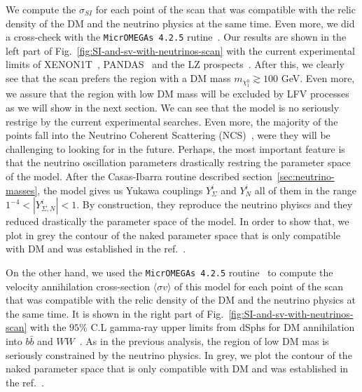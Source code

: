 \documentclass[12pt,letterpaper]{article}
\begin{document}
We compute the $\sigma_{SI}$ for each point of the scan that was compatible with the relic density of the DM and the neutrino physics at the same time. Even more, we did a cross-check with the \texttt{MicrOMEGAs 4.2.5} rutine~\cite{Belanger:2006is}. 
Our results are shown in the left part of Fig.~\ref{fig:SI-and-sv-with-neutrinos-scan} with the current experimental limits of XENON1T~\cite{Aprile:2018dbl}, PANDAS~\cite{Cui:2017nnn} and the LZ prospects~\cite{Mount:2017qzi}. 
After this, we clearly see that the scan prefers the region with a DM mass $m_{\chi^0_1}\gtrsim 100$ GeV. 
Even more, we assure that the region with low DM mass will be excluded by LFV processes as we will show in the next section.
We can see that the model is no seriously restrige by the current experimental searches. Even more, the majority of the points fall into the Neutrino Coherent Scattering (NCS)~\cite{Cushman:2013zza, Billard:2013qya}, were they will be challenging to looking for in the future.
Perhaps, the most important feature is that the neutrino oscillation parameters drastically restring the parameter space of the model. 
After the Casas-Ibarra routine described section~\ref{sec:neutrino-masses}, the model gives us Yukawa couplings $Y_{\Sigma}^i$ and $Y_N^i$ all of them in the range $1^{-4}<|Y_{\Sigma, N}^i|<1$. By construction, they reproduce the neutrino phyiscs and they reduced drastically the parameter space of the model. In order to show that, we plot in grey the contour of the naked parameter space that is only compatible with DM and was established in the ref.~\cite{Hirsch:2013ola}.   

On the other hand, we used the \texttt{MicrOMEGAs 4.2.5} routine~\cite{Belanger:2006is} to compute the velocity annihilation cross-section $\langle \sigma v\rangle$ of this model for each point of the scan that was compatible with the relic density of the DM and the neutrino physics at the same time. 
It is shown in the right part of Fig.~\ref{fig:SI-and-sv-with-neutrinos-scan} with the $95\%$ C.L gamma-ray upper limits from dSphs for DM annihilation into $b\bar{b}$ and $WW$~\cite{Ackermann:2015zua}.
As in the previous analysis, the region of low DM mas is seriously constrained by the neutrino physics. In grey, we plot the contour of the naked parameter space that is only compatible with DM and was established in the ref.~\cite{Hirsch:2013ola}.
\end{document}
